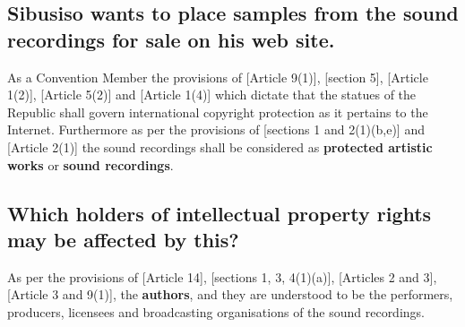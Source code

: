 \documentclass[11pt]{article}
\begin{document}
\subsection{Sibusiso wants to place samples from the sound recordings for sale on his web site.}
\label{sec:org89f1777}
As a Convention Member the provisions of [Article 9(1)]\cite{wto17_trips},
[section 5]\cite{rsa78_copyrightact}, [Article 1(2)]\cite{eurlex00_elec_commerce},
[Article 5(2)]\cite{wipo86_berne} and [Article 1(4)]\cite{wipo96_copyright_treaty}
which dictate that the statues of the Republic shall govern international
copyright protection as it pertains to the Internet. Furthermore as per the
provisions of [sections 1 and 2(1)(b,e)]\cite{rsa78_copyrightact} and [Article
2(1)]\cite{wipo86_berne} the sound recordings shall be considered as \textbf{protected
artistic works} or \textbf{sound recordings}.

\subsection{Which holders of intellectual property rights may be affected by this?}
\label{sec:org309e5d3}

As per the provisions of [Article 14]\cite{wto17_trips}, [sections 1, 3,
4(1)(a)]\cite{rsa78_copyrightact}, [Articles 2 and 3]\cite{wipo96_wppt}, [Article 3
and 9(1)]\cite{wipo86_berne}, the \textbf{authors}, and they are understood to be the
performers, producers, licensees and broadcasting organisations of the sound
recordings.
\end{document}

